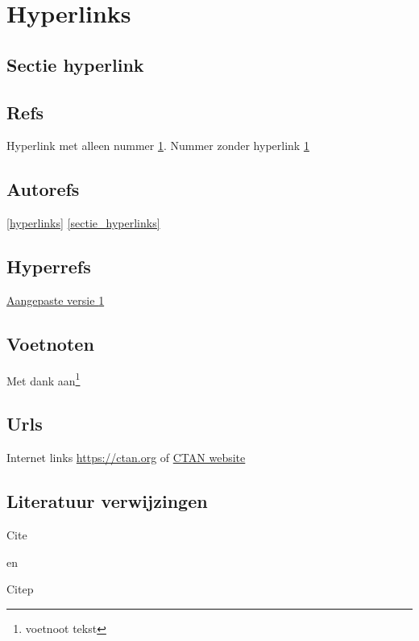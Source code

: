 \chapter{Hyperlinks}
\label{hyperlinks}

\blindtext[7]

\label{page_hyperlinks}

\section{Sectie hyperlink}
\label{sectie_hyperlinks}

\blindtext[7]

\section{Refs}

Hyperlink met alleen nummer \ref{hyperlinks}.  
Nummer zonder hyperlink \ref*{hyperlinks}

\section{Autorefs}

\autoref{hyperlinks}
\autoref{sectie_hyperlinks}

\section{Hyperrefs}

\hyperref[hyperlinks]{Aangepaste versie \ref*{hyperlinks}}

\section{Voetnoten}

\blindtext

Met dank aan\footnote{voetnoot tekst}

\blindtext

\section{Urls}

Internet links \url{https://ctan.org}
of \href{https://ctan.org}{CTAN website}

\section{Literatuur verwijzingen}

Cite \cite{Martin2018}

en

Citep \citep{Martin2018}
